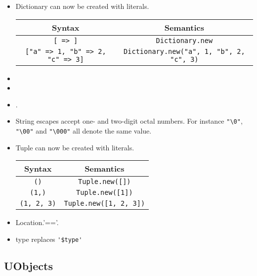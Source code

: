\begin{itemize}
\item Dictionary can now be created with literals.

  \begin{center}
    \begin{tabular}{|c|c|}
      \hline
      Syntax & Semantics\\
      \hline
      \lstinline|[ => ]|
      &
      \lstinline|Dictionary.new|
      \\
      \lstinline|["a" => 1, "b" => 2, "c" => 3]|
      &
      \lstinline|Dictionary.new("a", 1, "b", 2, "c", 3)|
      \\
      \hline
    \end{tabular}
  \end{center}

\item {}
\item {}
\item {}.
\item String escapes accept one- and two-digit octal numbers.
  For instance \lstinline|"\0"|, \lstinline|"\00"| and
  \lstinline|"\000"| all denote the same value.

\item Tuple can now be created with literals.

  \begin{center}
    \begin{tabular}{|c|c|}
      \hline
      Syntax & Semantics\\
      \hline
      \lstinline|()|        & \lstinline|Tuple.new([])| \\
      \lstinline|(1,)|      & \lstinline|Tuple.new([1])| \\
      \lstinline|(1, 2, 3)| & \lstinline|Tuple.new([1, 2, 3])| \\
      \hline
    \end{tabular}
  \end{center}

\item Location.'=='.

\item type replaces \lstinline|'$type'|
\end{itemize}

\subsection{UObjects}

